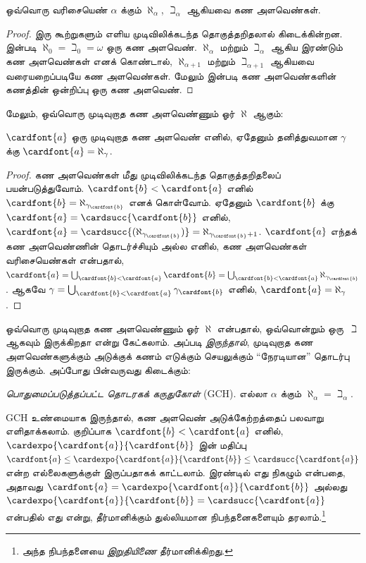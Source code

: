\documentclass[../../../include/open-logic-section]{subfiles}
\begin{document}
\begin{prop}
ஒவ்வொரு வரிசையெண் $\alpha$ க்கும் $\aleph_\alpha$,
$\beth_\alpha$ ஆகியவை கண அளவெண்கள்.
\end{prop}

\begin{proof}
இரு கூற்றுகளும் எளிய முடிவிலிக்கடந்த தொகுத்தறிதலால்
கிடைக்கின்றன. 
இன்படி $\aleph_0 = \beth_0 = \omega$ ஒரு கண அளவெண்.
$\aleph_\alpha$ மற்றும் $\beth_\alpha$ ஆகிய இரண்டும் கண
அளவெண்கள் எனக் கொண்டால், $\aleph_{\alpha+1}$ மற்றும்
$\beth_{\alpha+1}$ ஆகியவை வரையறைப்படியே கண அளவெண்கள்.
மேலும் 
இன்படி கண அளவெண்களின் கணத்தின் ஒன்றிப்பு ஒரு கண அளவெண்.
\end{proof}
\noindent
மேலும், ஒவ்வொரு முடிவுறாத கண அளவெண்ணும் ஓர் $\aleph$ ஆகும்:

\begin{prop}
$\cardfont{a}$ ஒரு முடிவுறாத கண அளவெண் எனில், ஏதேனும்
தனித்துவமான $\gamma$ க்கு $\cardfont{a} = \aleph_\gamma$.
\end{prop}

\begin{proof}
கண அளவெண்கள் மீது முடிவிலிக்கடந்த தொகுத்தறிதலைப்
பயன்படுத்துவோம். $\cardfont{b} < \cardfont{a}$ எனில்
$\cardfont{b} = \aleph_{\gamma_\cardfont{b}}$ எனக்
கொள்வோம். ஏதேனும் $\cardfont{b}$ க்கு
$\cardfont{a} = \cardsucc{\cardfont{b}}$ எனில்,
$\cardfont{a} = \cardsucc{(\aleph_{\gamma_\cardfont{b}})}=
\aleph_{\gamma_\cardfont{b}+1}$.
$\cardfont{a}$ எந்தக் கண அளவெண்ணின் தொடர்ச்சியும் அல்ல எனில்,
கண அளவெண்கள் வரிசையெண்கள் என்பதால்,
$\cardfont{a} = \bigcup_{\cardfont{b} < \cardfont{a}} \cardfont{b} =
\bigcup_{\cardfont{b} < \cardfont{a}}{\aleph_{\gamma_\cardfont{b}}}$.
ஆகவே $\gamma =
\bigcup_{\cardfont{b} < \cardfont{a}}\gamma_\cardfont{b}$ எனில்,
$\cardfont{a} = \aleph_\gamma$.
\end{proof}

ஒவ்வொரு முடிவுறாத கண அளவெண்ணும் ஓர் $\aleph$ என்பதால்,
ஒவ்வொன்றும் ஒரு~$\beth$ ஆகவும் இருக்கிறதா என்று கேட்கலாம்.
அப்படி \emph{இருந்தால்}, முடிவுறாத கண அளவெண்களுக்கும் அடுக்குக்
கணம் எடுக்கும் செயலுக்கும் ``நேரடியான'' தொடர்பு இருக்கும்.
அப்போது பின்வருவது கிடைக்கும்:

\begin{defish}
\emph{பொதுமைப்படுத்தப்பட்ட தொடரகக் கருதுகோள்} (GCH).
எல்லா $\alpha$ க்கும் $\aleph_\alpha  = \beth_\alpha$.
\end{defish}

GCH உண்மையாக இருந்தால், கண அளவெண் அடுக்கேற்றத்தைப் பலவாறு
எளிதாக்கலாம். குறிப்பாக $\cardfont{b} < \cardfont{a}$ எனில்,
$\cardexpo{\cardfont{a}}{\cardfont{b}}$ இன் மதிப்பு
$\cardfont{a}\leq \cardexpo{\cardfont{a}}{\cardfont{b}} \leq
\cardsucc{\cardfont{a}}$ என்ற எல்லைகளுக்குள் இருப்பதாகக்
காட்டலாம். இரண்டில் எது நிகழும் என்பதை, அதாவது
$\cardfont{a} = \cardexpo{\cardfont{a}}{\cardfont{b}}$
அல்லது $\cardexpo{\cardfont{a}}{\cardfont{b}} =
\cardsucc{\cardfont{a}}$ என்பதில் எது என்று,
தீர்மானிக்கும் துல்லியமான நிபந்தனைகளையும் தரலாம்.\footnote{அந்த
நிபந்தனையை \emph{இறுதியிணை} தீர்மானிக்கிறது.}
\end{document}
